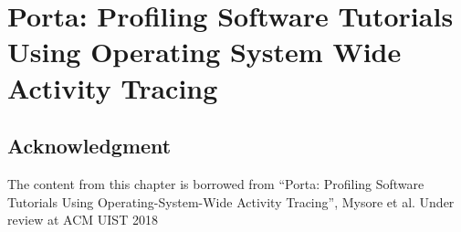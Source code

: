 \chapter{Porta: Profiling Software Tutorials Using Operating System Wide Activity Tracing}






\section{Acknowledgment}
The content from this chapter is borrowed from ``Porta: Profiling Software Tutorials Using Operating-System-Wide Activity Tracing'', Mysore et al. Under review at ACM UIST 2018
